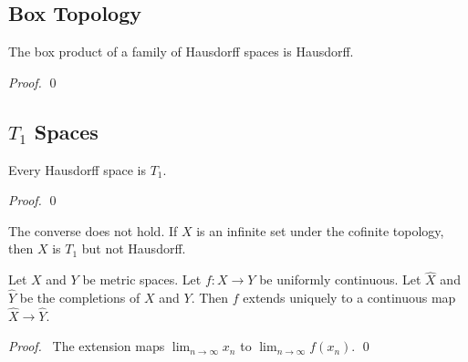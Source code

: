 \subsection{Box Topology}

\begin{prop}
The box product of a family of Hausdorff spaces is Hausdorff.
\end{prop}

\begin{proof}
\pf
{}
\qed
\end{proof}

\subsection{$T_1$ Spaces}

\begin{prop}
Every Hausdorff space is $T_1$.
\end{prop}

\begin{proof}
\pf
{}
\qed
\end{proof}

\begin{ex}
The converse does not hold. If $X$ is an infinite set under the cofinite topology, then $X$ is $T_1$ but not Hausdorff.
\end{ex}

\begin{prop}
Let $X$ and $Y$ be metric spaces. Let $f : X \rightarrow Y$ be uniformly continuous. Let $\hat{X}$ and $\hat{Y}$ be the completions of $X$ and $Y$. Then $f$ extends uniquely to a continuous map $\hat{X} \rightarrow \hat{Y}$.
\end{prop}

\begin{proof}
\pf\ The extension maps $\lim_{n \rightarrow \infty} x_n$ to $\lim_{n \rightarrow \infty} f(x_n)$. \qed
\end{proof}

